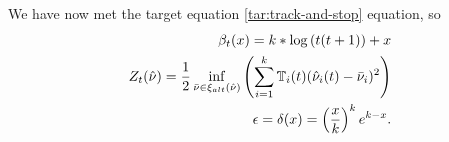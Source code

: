 We have now met the target equation \ref{tar:track-and-stop} equation, so 
\begin{align*}
\beta_{t}(x) = k * \log\left(t(t+1)\right) + x \\
Z_{t}(\hat{\nu}) = \frac{1}{2}\inf\limits_{\bar{\nu} \in \xi_{alt}(\hat{\nu})}\left(\sum_{i=1}^{k} \mathbb{T}_{i}(t)(\hat{\nu}_{i}(t) - \bar{\nu}_{i})^2\right) \\
\epsilon = \delta(x) = \left(\frac{x}{k}\right)^k e^{k-x}.
\end{align*}
